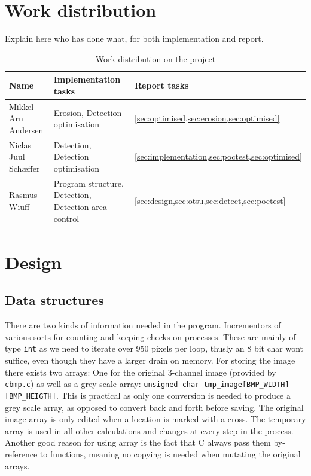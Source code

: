 \documentclass[a4paper, english]{article}
\numberwithin{equation}{section}
\begin{document}
\section{Work distribution}
Explain here who has done what, for both implementation and report.
\begin{table}[H]
    \centering
    \caption{Work distribution on the project}\label{tbl:ansvar}
    \begin{tabular}{lll}
        \toprule
        Name                 & Implementation tasks                                 & Report tasks                                      \\
        \midrule
        Mikkel Arn Andersen  & Erosion, Detection optimisation                      & \cref{sec:optimised,sec:erosion,sec:optimised}                                                  \\
        Niclas Juul Schæffer & Detection, Detection optimisation & \cref{sec:implementation,sec:poctest,sec:optimised}   \\
        Rasmus Wiuff         & Program structure, Detection, Detection area control & \cref{sec:design,sec:otsu,sec:detect,sec:poctest} \\
        \bottomrule
    \end{tabular}
\end{table}
\section{Design}\label{sec:design}
\subsection{Data structures}
There are two kinds of information needed in the program. Incrementors of various sorts for counting and keeping checks on processes. These are mainly of type \texttt{int} as we need to iterate over 950 pixels per loop, thusly an 8 bit char wont suffice, even though they have a larger drain on memory. For storing the image there exists two arrays: One for the original 3-channel image (provided by \texttt{cbmp.c}) as well as a grey scale array: \texttt{unsigned char tmp\_image[BMP\_WIDTH][BMP\_HEIGTH]}.
This is practical as only one conversion is needed to produce a grey scale array, as opposed to convert back and forth before saving. The original image array is only edited when a location is marked with a cross. The temporary array is used in all other calculations and changes at every step in the process. Another good reason for using array is the fact that C always pass them by-reference to functions, meaning no copying is needed when mutating the original arrays.
\end{document}
